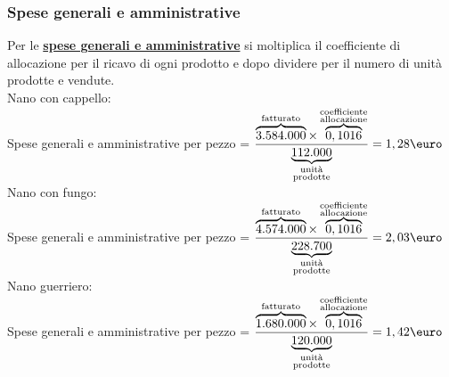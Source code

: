 \documentclass{article}
\begin{document}
\subsubsection*{Spese generali e amministrative}
Per le \textbf{\underline{spese generali e amministrative}} si moltiplica il coefficiente di allocazione per il ricavo di ogni prodotto e dopo dividere per il numero di unità prodotte e vendute.
\vspace*{0.2cm}\\
Nano con cappello:\\
Spese generali e amministrative per pezzo = $ \dfrac{\overbrace{3.584.000}^{\text{fatturato}} \times \overbrace{0,1016}^{\substack{\text{coefficiente} \\ \text{allocazione}}}}{\underbrace{112.000}_{\substack{\text{unità} \\ \text{prodotte}}}}=1,28\T{\euro}$
\vspace*{0.1cm}\\
Nano con fungo:\\
Spese generali e amministrative per pezzo = $ \dfrac{\overbrace{4.574.000}^{\text{fatturato}} \times \overbrace{0,1016}^{\substack{\text{coefficiente} \\ \text{allocazione}}}}{\underbrace{228.700}_{\substack{\text{unità} \\ \text{prodotte}}}}=2,03\T{\euro}$
\vspace*{0.1cm}\\
Nano guerriero:\\
Spese generali e amministrative per pezzo = $ \dfrac{\overbrace{1.680.000}^{\text{fatturato}} \times \overbrace{0,1016}^{\substack{\text{coefficiente} \\ \text{allocazione}}}}{\underbrace{120.000}_{\substack{\text{unità} \\ \text{prodotte}}}}=1,42\T{\euro}$
\end{document}
